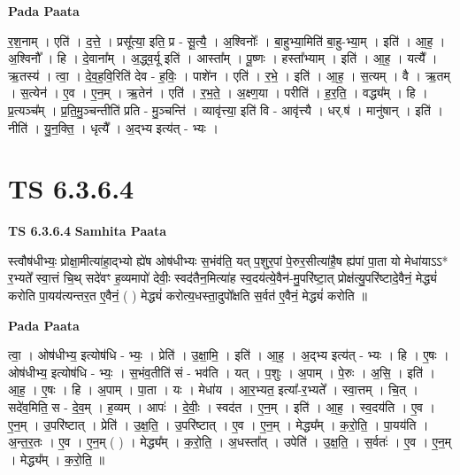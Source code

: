 \documentclass[17pt]{extarticle}
\begin{document}
\textbf{Pada Paata} \newline

र॒श॒नाम् । एति॑ । द॒त्ते॒ । प्रसू᳚त्या॒ इति॒ प्र - सू॒त्यै॒ । अ॒श्विनोः᳚ । बा॒हुभ्या॒मिति॑ बा॒हु-भ्या॒म् । इति॑ । आ॒ह॒ । अ॒श्विनौ᳚ । हि । दे॒वाना᳚म् । अ॒द्ध्व॒र्यू इति॑ । आस्ता᳚म् । पू॒ष्णः । हस्ता᳚भ्याम् । इति॑ । आ॒ह॒ । यत्यै᳚ । ऋ॒तस्य॑ । त्वा॒ । दे॒व॒ह॒वि॒रिति॑ देव - ह॒विः॒ । पाशे॑न । एति॑ । र॒भे॒ । इति॑ । आ॒ह॒ । स॒त्यम् । वै । ऋ॒तम् । स॒त्येन॑ । ए॒व । ए॒न॒म् । ऋ॒तेन॑ । एति॑ । र॒भ॒ते॒ । अ॒क्ष्ण॒या । परीति॑ । ह॒र॒ति॒ । वद्ध्य᳚म् । हि । प्र॒त्यञ्च᳚म् । प्र॒ति॒मु॒ञ्चन्तीति॑ प्रति - मु॒ञ्चन्ति॑ । व्यावृ॑त्त्या॒ इति॑ वि - आवृ॑त्त्यै । धर्.ष॑ । मानु॑षान् । इति॑ । नीति॑ । यु॒न॒क्ति॒ । धृत्यै᳚ । अ॒द्भ्य इत्य॑त् - भ्यः ।  \newline




\section*{ TS 6.3.6.4 }

\textbf{TS 6.3.6.4 } \newline
\textbf{Samhita Paata} \newline

स्त्वौष॑धीभ्यः॒ प्रोक्षा॒मीत्या॑हा॒द्भ्यो ह्ये॑ष ओष॑धीभ्यः स॒भंव॑ति॒ यत् प॒शुर॒पां पे॒रुर॒सीत्या॑है॒ष ह्य॑पां पा॒ता यो मेधा॑याऽऽ* र॒भ्यते᳚ स्वा॒त्तं चि॒थ् सदे॑वꣳ ह॒व्यमापो॑ देवीः॒ स्वद॑तैन॒मित्या॑ह स्व॒दय॑त्ये॒वैन॑-मु॒परि॑ष्टा॒त् प्रोक्ष॑त्यु॒परि॑ष्टादे॒वैनं॒ मेद्ध्यं॑ करोति पा॒यय॑त्यन्तर॒त ए॒वैनं॒ ( ) मेद्ध्यं॑ करोत्य॒धस्ता॒दुपो᳚क्षति स॒र्वत॑ ए॒वैनं॒ मेद्ध्यं॑ करोति ॥ \newline

\textbf{Pada Paata} \newline

त्वा॒ । ओष॑धीभ्य॒ इत्योष॑धि - भ्यः॒ । प्रेति॑ । उ॒क्षा॒मि॒ । इति॑ । आ॒ह॒ । अ॒द्भ्य इत्य॑त् - भ्यः । हि । ए॒षः । ओष॑धीभ्य॒ इत्योष॑धि - भ्यः॒ । स॒भंव॒तीति॑ सं - भव॑ति । यत् । प॒शुः । अ॒पाम् । पे॒रुः । अ॒सि॒ । इति॑ । आ॒ह॒ । ए॒षः । हि । अ॒पाम् । पा॒ता । यः । मेधा॑य । आ॒र॒भ्यत॒ इत्या᳚-र॒भ्यते᳚ । स्वा॒त्तम् । चि॒त् । सदे॑व॒मिति॒ स - दे॒व॒म् । ह॒व्यम् । आपः॑ । दे॒वीः॒ । स्वद॑त । ए॒न॒म् । इति॑ । आ॒ह॒ । स्व॒दय॑ति । ए॒व । ए॒न॒म् । उ॒परि॑ष्टात् । प्रेति॑ । उ॒क्ष॒ति॒ । उ॒परि॑ष्टात् । ए॒व । ए॒न॒म् । मेद्ध्य᳚म् । क॒रो॒ति॒ । पा॒यय॑ति । अ॒न्त॒र॒तः । ए॒व । ए॒न॒म् ( ) । मेद्ध्य᳚म् । क॒रो॒ति॒ । अ॒धस्ता᳚त् । उपेति॑ । उ॒क्ष॒ति॒ । स॒र्वतः॑ । ए॒व । ए॒न॒म् । मेद्ध्य᳚म् । क॒रो॒ति॒ ॥  \newline
\end{document}

